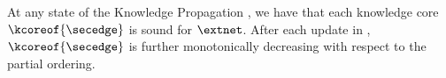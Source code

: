 \begin{theorem}
    \label{the:soundnessKnowledgePropagation}
    At any state of the Knowledge Propagation , we have that each knowledge core $\kcoreof{\secedge}$ is sound for $\extnet$.
    After each update in , $\kcoreof{\secedge}$ is further monotonically decreasing with respect to the partial ordering.
\end{theorem}
